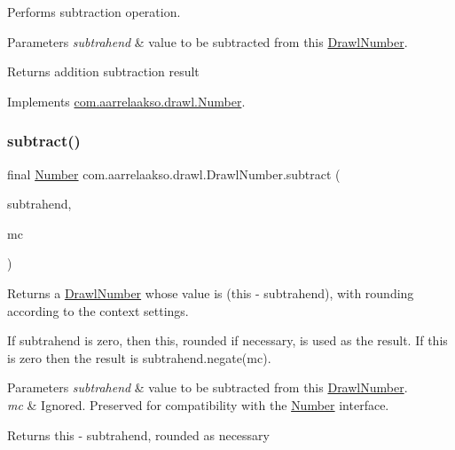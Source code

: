 Performs subtraction operation. 


\begin{DoxyParams}{Parameters}
{\em subtrahend} & value to be subtracted from this \hyperlink{classcom_1_1aarrelaakso_1_1drawl_1_1_drawl_number}{Drawl\+Number}. \\
\hline
\end{DoxyParams}
\begin{DoxyReturn}{Returns}
addition subtraction result 
\end{DoxyReturn}


Implements \hyperlink{interfacecom_1_1aarrelaakso_1_1drawl_1_1_number_ac28e81198ea485a48568a9a543cb5293}{com.\+aarrelaakso.\+drawl.\+Number}.

\mbox{\label{classcom_1_1aarrelaakso_1_1drawl_1_1_drawl_number_aaf0d1f797d24144d3ec2dba861217cb9}} 
\subsubsection{\texorpdfstring{subtract()}{subtract()}\hspace{0.1cm}{\footnotesize\ttfamily [2/3]}}
{\footnotesize\ttfamily final \hyperlink{interfacecom_1_1aarrelaakso_1_1drawl_1_1_number}{Number} com.\+aarrelaakso.\+drawl.\+Drawl\+Number.\+subtract (\begin{DoxyParamCaption}\item[{@Not\+Null final \hyperlink{interfacecom_1_1aarrelaakso_1_1drawl_1_1_number}{Number}}]{subtrahend,  }\item[{final Math\+Context}]{mc }\end{DoxyParamCaption})}



Returns a \hyperlink{classcom_1_1aarrelaakso_1_1drawl_1_1_drawl_number}{Drawl\+Number} whose value is (this -\/ subtrahend), with rounding according to the context settings. 

If subtrahend is zero, then this, rounded if necessary, is used as the result. If this is zero then the result is subtrahend.\+negate(mc).


\begin{DoxyParams}{Parameters}
{\em subtrahend} & value to be subtracted from this \hyperlink{classcom_1_1aarrelaakso_1_1drawl_1_1_drawl_number}{Drawl\+Number}. \\
\hline
{\em mc} & Ignored. Preserved for compatibility with the \hyperlink{interfacecom_1_1aarrelaakso_1_1drawl_1_1_number}{Number} interface. \\
\hline
\end{DoxyParams}
\begin{DoxyReturn}{Returns}
this -\/ subtrahend, rounded as necessary 
\end{DoxyReturn}

